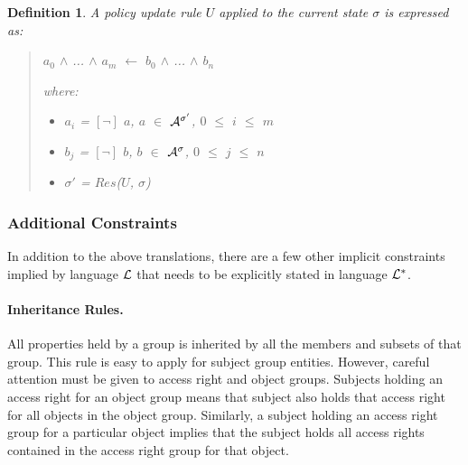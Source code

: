 \documentclass[10pt, twocolumn]{article}
\newtheorem{definition}{Definition}
\begin{document}
          \begin{definition}
            A policy update rule $U$ applied to the current state $\sigma$ is
            expressed as:

            \begin{quote}
              $a_{0}$ $\land$ ... $\land$ $a_{m}$ $\leftarrow$ $b_{0}$ $\land$ ... $\land$ $b_{n}$

              where:

              \begin{itemize}
                \item
                  $a_{i}$ = $[\lnot]$ $a$, $a$ $\in$ ${\cal A}^{\sigma'}$, $0$ $\leq$ $i$ $\leq$ $m$
                \item
                  $b_{j}$ = $[\lnot]$ $b$, $b$ $\in$ ${\cal A}^{\sigma}$, $0$ $\leq$ $j$ $\leq$ $n$
                \item
                  $\sigma'$ = $Res$($U$, $\sigma$)
              \end{itemize}
            \end{quote}
          \end{definition}

      \subsubsection{Additional Constraints}

        In addition to the above translations, there are a few other implicit
        constraints implied by language ${\cal L}$ that needs to be explicitly
        stated in language ${\cal L}^{*}$.

        \paragraph{Inheritance Rules.}

          All properties held by a group is inherited by all the members and
          subsets of that group. This rule is easy to apply for subject group
          entities. However, careful attention must be given to access right
          and object groups. Subjects holding an access right for an object
          group means that subject also holds that access right for all objects
          in the object group. Similarly, a subject holding an access right
          group for a particular object implies that the subject holds
          all access rights contained in the access right group for that
          object.
\end{document}

